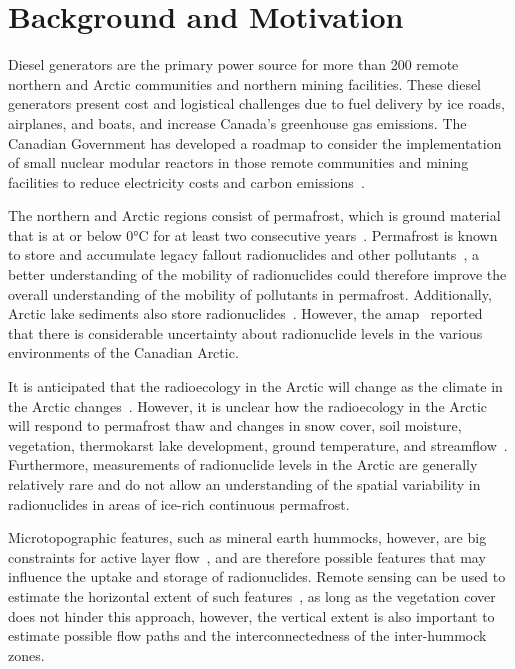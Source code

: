 \chapter{Background and Motivation}
Diesel generators are the primary power source for more than 200 remote northern and Arctic communities and northern mining facilities. 
These diesel generators present cost and logistical challenges due to fuel delivery by ice roads, airplanes, and boats, and increase Canada's greenhouse gas emissions. 
The Canadian Government has developed a roadmap to consider the implementation of small nuclear modular reactors in those remote communities and mining facilities to 
reduce electricity costs and carbon emissions~\citep{canadiansmallmodularreactorroadmapsteeringcommitteeCallActionCanadian2018}.

The northern and Arctic regions consist of permafrost, which is ground material that is at or below 0°C for at least two consecutive years~\citep{lewkowiczIllustratedPermafrostDictionary2024}. 
Permafrost is known to store and accumulate legacy fallout radionuclides and other pollutants~\citep{bondPermafrostThawImplications2018, olsonMercuryCyclingNorthern2018}, 
a better understanding of the mobility of radionuclides could therefore improve the overall understanding of the mobility of pollutants in permafrost. 
Additionally, Arctic lake sediments also store radionuclides~\citep{marshLakeSedimentationMackenzie1999}. 
However, the \gls{amap}~\citep{arcticmonitoringandassessmentprogrammeamapAMAPAssessment20152015} reported that there is considerable uncertainty about radionuclide levels in the various environments of the Canadian Arctic.

It is anticipated that the radioecology in the Arctic will change as the climate in the Arctic changes~\citep{arcticmonitoringandassessmentprogrammeamapAMAPAssessment20152015, bondPermafrostThawImplications2018}. 
However, it is unclear how the radioecology in the Arctic will respond to permafrost thaw and changes in snow cover, soil moisture, vegetation, thermokarst lake development, ground temperature, and streamflow~\citep{overlandIntegratedIndexRecent2019}. 
Furthermore, measurements of radionuclide levels in the Arctic are generally relatively rare and do not allow an understanding of the spatial variability in radionuclides in areas of ice-rich continuous permafrost.

Microtopographic features, such as mineral earth hummocks, however, are big constraints for active layer flow~\citep{quintonSubsurfaceDrainageHummockcovered2000}, and are therefore possible features that may influence the uptake and storage of radionuclides. 
Remote sensing can be used to estimate the horizontal extent of such features~\citep{dakinHowDryYear2023}, as long as the vegetation cover does not hinder this approach, however, the vertical extent is also important to estimate possible flow paths and the interconnectedness of the inter-hummock zones.

